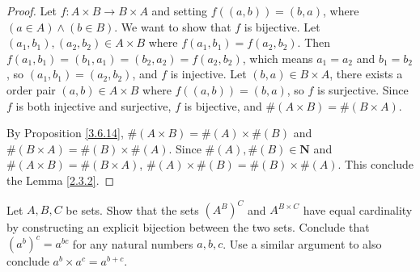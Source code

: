\begin{proof}
    Let \(f : A \times B \to B \times A\) and setting \(f((a, b)) = (b, a)\), where \((a \in A) \land (b \in B)\).
    We want to show that \(f\) is bijective.
    Let \((a_1, b_1), (a_2, b_2) \in A \times B\) where \(f(a_1, b_1) = f(a_2, b_2)\).
    Then \(f(a_1, b_1) = (b_1, a_1) = (b_2, a_2) = f(a_2, b_2)\), which means \(a_1 = a_2\) and \(b_1 = b_2\), so \((a_1, b_1) = (a_2, b_2)\), and \(f\) is injective.
    Let \((b, a) \in B \times A\), there exists a order pair \((a, b) \in A \times B\) where \(f((a, b)) = (b, a)\), so \(f\) is surjective.
    Since \(f\) is both injective and surjective, \(f\) is bijective, and \(\#(A \times B) = \#(B \times A)\).

    By Proposition \ref{3.6.14}, \(\#(A \times B) = \#(A) \times \#(B)\) and \(\#(B \times A) = \#(B) \times \#(A)\).
    Since \(\#(A), \#(B) \in \mathbf{N}\) and \(\#(A \times B) = \#(B \times A)\), \(\#(A) \times \#(B) = \#(B) \times \#(A)\).
    This conclude the Lemma \ref{2.3.2}.
\end{proof}

\begin{exercise}\label{ex 3.6.6}
    Let \(A, B, C\) be sets.
    Show that the sets \((A^B)^C\) and \(A^{B \times C}\) have equal cardinality by constructing an explicit bijection between the two sets.
    Conclude that \((a^b)^c = a^{bc}\) for any natural numbers \(a, b, c\).
    Use a similar argument to also conclude \(a^b \times a^c = a^{b+c}\).
\end{exercise}

